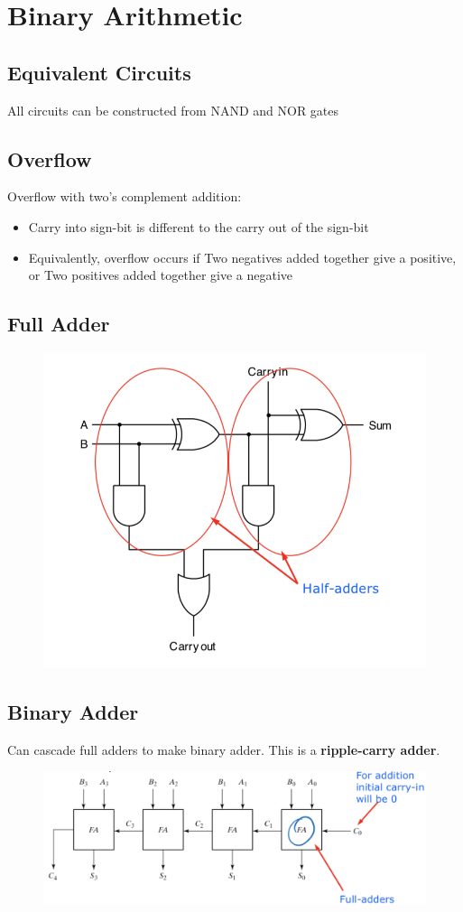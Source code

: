 \section{Binary Arithmetic}
\subsection{Equivalent Circuits}
All circuits can be constructed from NAND and NOR gates

\subsection{Overflow}
Overflow with two's complement addition:
\begin{itemize}
	\item Carry into sign-bit is different to the carry out of the sign-bit
	\item Equivalently, overflow occurs if
	\subitem Two negatives added together give a positive, or
	\subitem Two positives added together give a negative	
\end{itemize}

\subsection{Full Adder}
\begin{figure}[H]
	\includegraphics[width=0.8\linewidth]{fulladder}	
\end{figure}


\subsection{Binary Adder}
Can cascade full adders to make binary adder. This is a \textbf{ripple-carry adder}.
\begin{figure}[H]
	\includegraphics[width=0.8\linewidth]{binaryadder}	
\end{figure}



